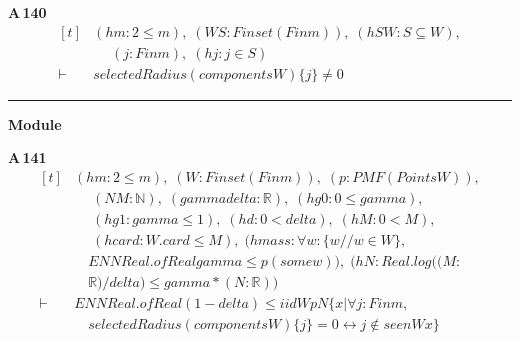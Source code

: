 \noindent\textbf{A\,140}\quad{}
{\footnotesize\[ \begin{aligned}[t]
&(\mathit{hm} : 2 \leq \mathit{m}),\; (\mathit{W} \mathit{S} : \mathit{Finset} (\mathit{Fin} \mathit{m})),\; (\mathit{hSW} : \mathit{S} \subseteq \mathit{W}),\\
&\quad \; (\mathit{j} : \mathit{Fin} \mathit{m}),\; (\mathit{hj} : \mathit{j} \in \mathit{S})\\
\vdash\;&\mathit{selectedRadius} (\mathit{components} \mathit{W}) \{ \mathit{j}\} \neq 0
\end{aligned} \]}

\vspace{4pt}\noindent\rule{\columnwidth}{0.4pt}\par\vspace{2pt}
\noindent\textbf{Module }\par\vspace{3pt}

\noindent\textbf{A\,141}\quad{}
{\footnotesize\[ \begin{aligned}[t]
&(\mathit{hm} : 2 \leq \mathit{m}),\; (\mathit{W} : \mathit{Finset} (\mathit{Fin} \mathit{m})),\; (\mathit{p} : \mathit{PMF} (\mathit{Points} \mathit{W})),\\
&\quad \; (\mathit{N} \mathit{M} : \mathbb{N} ),\; (\mathit{gamma} \mathit{delta} : \mathbb{R} ),\; (\mathit{hg0} : 0 \leq \mathit{gamma}),\\
&\quad \; (\mathit{hg1} : \mathit{gamma} \leq 1),\; (\mathit{hd} : 0 < \mathit{delta}),\; (\mathit{hM} : 0 < \mathit{M}),\\
&\quad \; (\mathit{hcard} : \mathit{W}.\mathit{card} \leq \mathit{M}),\; (\mathit{hmass} : \forall \mathit{w} : \{ \mathit{w} // \mathit{w} \in \mathit{W}\} ,\\
&\quad \mathit{ENNReal}.\mathit{ofReal} \mathit{gamma} \leq \mathit{p} (\mathit{some} \mathit{w})),\; (\mathit{hN} : \mathit{Real}.\mathit{log} ((\mathit{M}:\\
&\quad \mathbb{R} )/\mathit{delta}) \leq \mathit{gamma}*(\mathit{N}:\mathbb{R} ))\\
\vdash\;&\mathit{ENNReal}.\mathit{ofReal} (1-\mathit{delta}) \leq \mathit{iid} \mathit{W} \mathit{p} \mathit{N} \{ \mathit{x} | \forall \mathit{j} : \mathit{Fin} \mathit{m},\\
&\quad \mathit{selectedRadius} (\mathit{components} \mathit{W}) \{ \mathit{j}\} = 0 \leftrightarrow \mathit{j} \notin \mathit{seen} \mathit{W} \mathit{x}\}
\end{aligned} \]}

